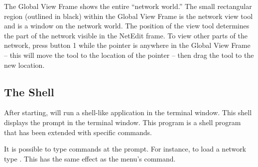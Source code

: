 The Global View Frame shows the entire ``network world.''  The small
rectangular region (outlined in black) within the Global View Frame is the
network view tool and is a window on the network world. The
position of the view tool determines the part of the network 
visible in the NetEdit frame.  To view other parts of the network, press
button 1 while the pointer is anywhere in the Global View Frame -- this will
move the tool to the location of the pointer --  then drag the tool to the
new location.


\subsection{The \sr{} Shell}
\label{sec:termapp}

After starting, \sr{} will run a shell-like application in the terminal
window. This shell displays the prompt
 in the terminal window.  This program is a
 shell program that has been extended with
\sr{} specific commands.

It is possible to type \tcl{} \sr{} commands at the prompt.  For
instance, to load a network type .  This has the same effect as the 
menu's  command.



